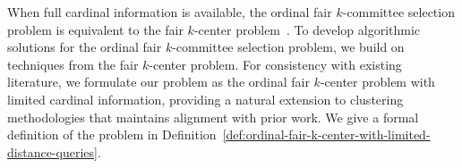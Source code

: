 When full cardinal information is available, the ordinal fair $k$-committee selection problem is equivalent to the fair $k$-center problem~\cite{kleindessner2019fair}. 
To develop algorithmic solutions for the ordinal fair $k$-committee selection problem, we build on techniques from the fair $k$-center problem. 
For consistency with existing literature, we formulate our problem as the ordinal fair $k$-center problem with limited cardinal information, providing a natural extension to clustering methodologies that maintains alignment with prior work. 
We give a formal definition of the problem in Definition~\ref{def:ordinal-fair-k-center-with-limited-distance-queries}.
